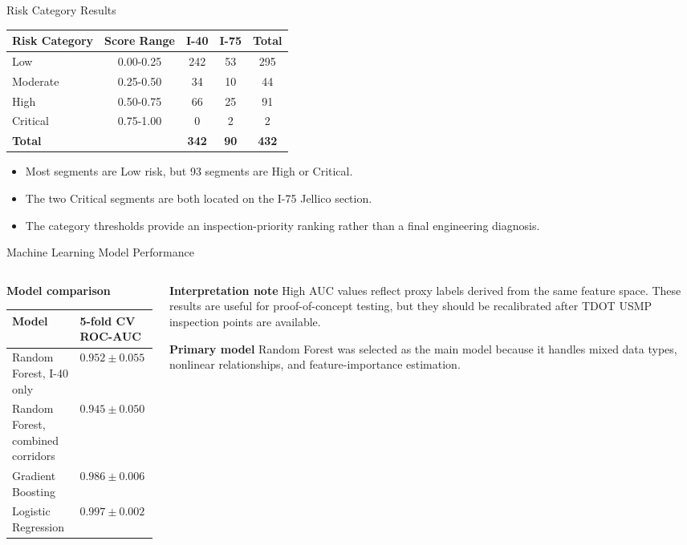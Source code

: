 \documentclass[aspectratio=169,11pt]{beamer}
\newcommand{\slideheading}[1]{\vspace{0.05cm}\textbf{#1}\vspace{0.12cm}}
\begin{document}
\begin{frame}{Risk Category Results}
\centering
\small
\begin{tabular}{lcccc}
\toprule
\textbf{Risk Category} & \textbf{Score Range} & \textbf{I-40} & \textbf{I-75} & \textbf{Total} \\
\midrule
Low & 0.00-0.25 & 242 & 53 & 295 \\
Moderate & 0.25-0.50 & 34 & 10 & 44 \\
High & 0.50-0.75 & 66 & 25 & 91 \\
Critical & 0.75-1.00 & 0 & 2 & 2 \\
\midrule
\textbf{Total} & & \textbf{342} & \textbf{90} & \textbf{432} \\
\bottomrule
\end{tabular}
\vspace{0.45cm}
\begin{itemize}\setlength\itemsep{0.3em}
  \item Most segments are Low risk, but 93 segments are High or Critical.
  \item The two Critical segments are both located on the I-75 Jellico section.
  \item The category thresholds provide an inspection-priority ranking rather than a final engineering diagnosis.
\end{itemize}
\end{frame}

\begin{frame}{Machine Learning Model Performance}
\begin{columns}[T,onlytextwidth]
\begin{column}{0.52\textwidth}
\slideheading{Model comparison}
\scriptsize
\begin{tabularx}{\linewidth}{Y C{2.6cm}}
\toprule
\textbf{Model} & \textbf{5-fold CV ROC-AUC} \\
\midrule
Random Forest, I-40 only & $0.952 \pm 0.055$ \\
Random Forest, combined corridors & $0.945 \pm 0.050$ \\
Gradient Boosting & $0.986 \pm 0.006$ \\
Logistic Regression & $0.997 \pm 0.002$ \\
\bottomrule
\end{tabularx}
\end{column}
\begin{column}{0.43\textwidth}
\slideheading{Interpretation note}
\footnotesize
High AUC values reflect proxy labels derived from the same feature space. These results are useful for proof-of-concept testing, but they should be recalibrated after TDOT USMP inspection points are available.
\vspace{0.3cm}

\slideheading{Primary model}
\footnotesize
Random Forest was selected as the main model because it handles mixed data types, nonlinear relationships, and feature-importance estimation.
\end{column}
\end{columns}
\end{frame}
\end{document}
